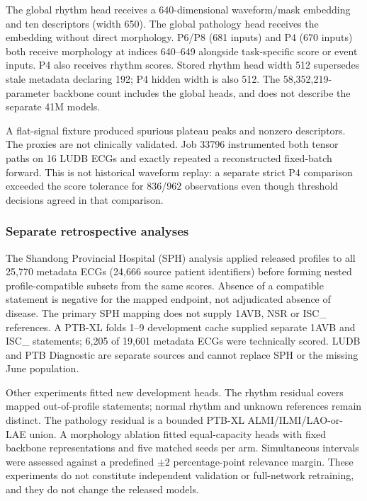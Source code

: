 \documentclass[life,article,submit,moreauthors]{Definitions/mdpi}
\begin{document}
The global rhythm head receives a 640-dimensional waveform/mask embedding and ten descriptors (width 650). The global pathology head receives the embedding without direct morphology. P6/P8 (681 inputs) and P4 (670 inputs) both receive morphology at indices 640--649 alongside task-specific score or event inputs. P4 also receives rhythm scores. Stored rhythm head width 512 supersedes stale metadata declaring 192; P4 hidden width is also 512. The 58,352,219-parameter backbone count includes the global heads, and does not describe the separate 41M models.

A flat-signal fixture produced spurious plateau peaks and nonzero descriptors. The proxies are not clinically validated. Job 33796 instrumented both tensor paths on 16 LUDB ECGs and exactly repeated a reconstructed fixed-batch forward. This is not historical waveform replay: a separate strict P4 comparison exceeded the score tolerance for 836/962 observations even though threshold decisions agreed in that comparison.

\subsubsection{Separate retrospective analyses}
\label{sec:retrospective-methods}

The Shandong Provincial Hospital (SPH) analysis applied released profiles to all 25,770 metadata ECGs (24,666 source patient identifiers) before forming nested profile-compatible subsets from the same scores. Absence of a compatible statement is negative for the mapped endpoint, not adjudicated absence of disease. The primary SPH mapping does not supply 1AVB, NSR or ISC\_ references. A PTB-XL folds 1--9 development cache supplied separate 1AVB and ISC\_ statements; 6,205 of 19,601 metadata ECGs were technically scored. LUDB and PTB Diagnostic are separate sources and cannot replace SPH or the missing June population.

Other experiments fitted new development heads. The rhythm residual covers mapped out-of-profile statements; normal rhythm and unknown references remain distinct. The pathology residual is a bounded PTB-XL ALMI/ILMI/LAO-or-LAE union. A morphology ablation fitted equal-capacity heads with fixed backbone representations and five matched seeds per arm. Simultaneous intervals were assessed against a predefined $\pm2$ percentage-point relevance margin. These experiments do not constitute independent validation or full-network retraining, and they do not change the released models.
\end{document}
